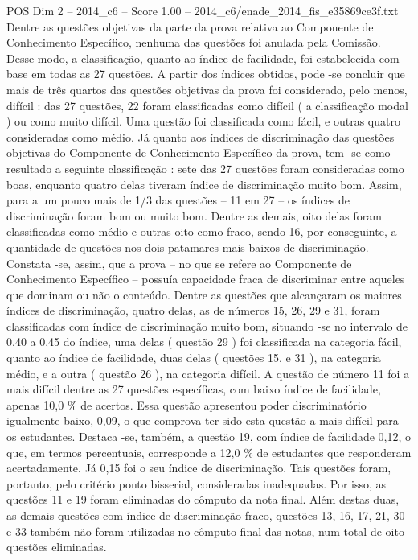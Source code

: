 \begin{textsample}{POS Dim 2 – 2014\_c6 – Score 1.00 – 2014\_c6/enade\_2014\_fis\_e35869ce3f.txt}
Dentre as questões objetivas da parte da prova relativa ao Componente de Conhecimento Específico, nenhuma das questões foi anulada pela Comissão.
Desse modo, a classificação, quanto ao índice de facilidade, foi estabelecida com base em todas as 27 questões.
A partir dos índices obtidos, pode -se concluir que mais de três quartos das questões objetivas da prova foi considerado, pelo menos, difícil : das 27 questões, 22 foram classificadas como difícil ( a classificação modal ) ou como muito difícil.
Uma questão foi classificada como fácil, e outras quatro consideradas como médio.
Já quanto aos índices de discriminação das questões objetivas do Componente de Conhecimento Específico da prova, tem -se como resultado a seguinte classificação : sete das 27 questões foram consideradas como boas, enquanto quatro delas tiveram índice de discriminação muito bom.
Assim, para a um pouco mais de 1/3 das questões – 11 em 27 – os índices de discriminação foram bom ou muito bom.
Dentre as demais, oito delas foram classificadas como médio e outras oito como fraco, sendo 16, por conseguinte, a quantidade de questões nos dois patamares mais baixos de discriminação.
Constata -se, assim, que a prova – no que se refere ao Componente de Conhecimento Específico – possuía capacidade fraca de discriminar entre aqueles que dominam ou não o conteúdo.
Dentre as questões que alcançaram os maiores índices de discriminação, quatro delas, as de números 15, 26, 29 e 31, foram classificadas com índice de discriminação muito bom, situando -se no intervalo de 0,40 a 0,45 do índice, uma delas ( questão 29 ) foi classificada na categoria fácil, quanto ao índice de facilidade, duas delas ( questões 15, e 31 ), na categoria médio, e a outra ( questão 26 ), na categoria difícil.
A questão de número 11 foi a mais difícil dentre as 27 questões específicas, com baixo índice de facilidade, apenas 10,0 \% de acertos.
Essa questão apresentou poder discriminatório igualmente baixo, 0,09, o que comprova ter sido esta questão a mais difícil para os estudantes.
Destaca -se, também, a questão 19, com índice de facilidade 0,12, o que, em termos percentuais, corresponde a 12,0 \% de estudantes que responderam acertadamente.
Já 0,15 foi o seu índice de discriminação.
Tais questões foram, portanto, pelo critério ponto bisserial, consideradas inadequadas.
Por isso, as questões 11 e 19 foram eliminadas do cômputo da nota final.
Além destas duas, as demais questões com índice de discriminação fraco, questões 13, 16, 17, 21, 30 e 33 também não foram utilizadas no cômputo final das notas, num total de oito questões eliminadas.

\end{textsample}

